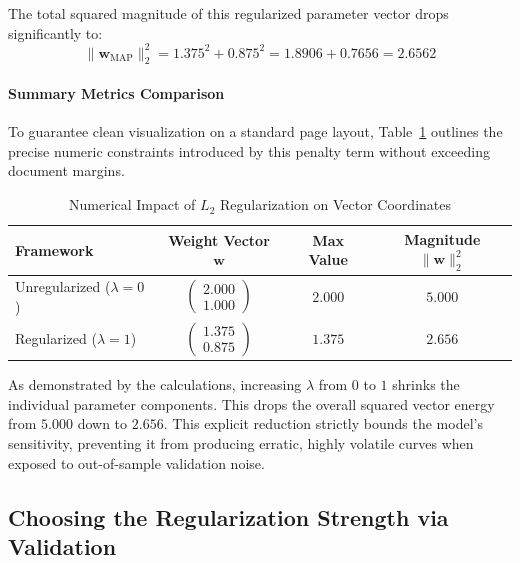 \documentclass{article}
\begin{document}
The total squared magnitude of this regularized parameter vector drops significantly to:
\begin{equation}
\|\mathbf{w}_{\text{MAP}}\|_2^2 = 1.375^2 + 0.875^2 = 1.8906 + 0.7656 = 2.6562
\end{equation}

\paragraph{Summary Metrics Comparison}
To guarantee clean visualization on a standard page layout, Table~\ref{tab:numerical_ridge_comparison} outlines the precise numeric constraints introduced by this penalty term without exceeding document margins.

\begin{table}[htbp]
\centering
\small
\renewcommand{\arraystretch}{1.3}
\begin{tabular}{|l|c|c|c|}
\hline
\textbf{Framework} & \textbf{Weight Vector } $\mathbf{w}$ & \textbf{Max Value} & \textbf{Magnitude } $\|\mathbf{w}\|_2^2$ \\ \hline
Unregularized ($\lambda = 0$) & $\begin{pmatrix} 2.000 \\ 1.000 \end{pmatrix}$ & $2.000$ & $5.000$ \\ \hline
Regularized ($\lambda = 1$)   & $\begin{pmatrix} 1.375 \\ 0.875 \end{pmatrix}$ & $1.375$ & $2.656$ \\ \hline
\end{tabular}
\caption{Numerical Impact of $L_2$ Regularization on Vector Coordinates}
\label{tab:numerical_ridge_comparison}
\end{table}

As demonstrated by the calculations, increasing $\lambda$ from $0$ to $1$ shrinks the individual parameter components. This drops the overall squared vector energy from $5.000$ down to $2.656$. This explicit reduction strictly bounds the model's sensitivity, preventing it from producing erratic, highly volatile curves when exposed to out-of-sample validation noise.

\subsection{Choosing the Regularization Strength via Validation}
\end{document}
